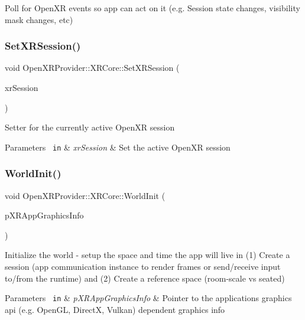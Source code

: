 Poll for Open\+XR events so app can act on it (e.\+g. Session state changes, visibility mask changes, etc) 

\mbox{\label{class_open_x_r_provider_1_1_x_r_core_a8a8ff9cd05d8343cc67bdc646063f7e8}} 
\subsubsection{\texorpdfstring{SetXRSession()}{SetXRSession()}}
{\footnotesize\ttfamily void Open\+X\+R\+Provider\+::\+X\+R\+Core\+::\+Set\+X\+R\+Session (\begin{DoxyParamCaption}\item[{Xr\+Session}]{xr\+Session }\end{DoxyParamCaption})\hspace{0.3cm}{\ttfamily [inline]}}

Setter for the currently active Open\+XR session 
\begin{DoxyParams}[1]{Parameters}
\mbox{\texttt{ in}}  & {\em xr\+Session} & Set the active Open\+XR session \\
\hline
\end{DoxyParams}
\mbox{\label{class_open_x_r_provider_1_1_x_r_core_ad6d93e9d26622e99807338346f68c0de}} 
\subsubsection{\texorpdfstring{WorldInit()}{WorldInit()}}
{\footnotesize\ttfamily void Open\+X\+R\+Provider\+::\+X\+R\+Core\+::\+World\+Init (\begin{DoxyParamCaption}\item[{X\+R\+App\+Graphics\+Info $\ast$}]{p\+X\+R\+App\+Graphics\+Info }\end{DoxyParamCaption})\hspace{0.3cm}{\ttfamily [private]}}

Initialize the world -\/ setup the space and time the app will live in (1) Create a session (app communication instance to render frames or send/receive input to/from the runtime) and (2) Create a reference space (room-\/scale vs seated) 
\begin{DoxyParams}[1]{Parameters}
\mbox{\texttt{ in}}  & {\em p\+X\+R\+App\+Graphics\+Info} & Pointer to the application\textquotesingle{}s graphics api (e.\+g. Open\+GL, DirectX, Vulkan) dependent graphics info \\
\hline
\end{DoxyParams}
\mbox{\label{class_open_x_r_provider_1_1_x_r_core_a9fd6ddde34eb71f3b41966db79b54b22}} 
